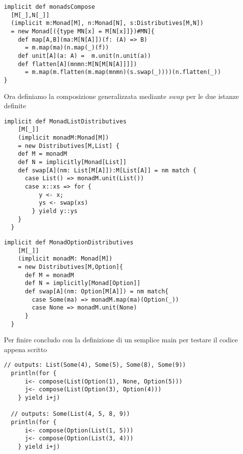 \begin{lstlisting}[style=myScalastyle, caption=SComposable is Monad]
implicit def monadsCompose
  [M[_],N[_]]
  (implicit m:Monad[M], n:Monad[N], s:Distributives[M,N])
  = new Monad[({type MN[x] = M[N[x]]})#MN]{
    def map[A,B](ma:M[N[A]])(f: (A) => B)
      = m.map(ma)(n.map(_)(f))
    def unit[A](a: A) =  m.unit(n.unit(a))
    def flatten[A](mnmn:M[N[M[N[A]]]])
      = m.map(m.flatten(m.map(mnmn)(s.swap(_))))(n.flatten(_))
}
\end{lstlisting}

Ora definiamo la composizione generalizzata mediante $swap$ per le due istanze
definite
\begin{lstlisting}[style=myScalastyle, caption=Composing List]
  implicit def MonadListDistributives
    [M[_]]
    (implicit monadM:Monad[M])
    = new Distributives[M,List] {
    def M = monadM
    def N = implicitly[Monad[List]]
    def swap[A](nm: List[M[A]]):M[List[A]] = nm match {
      case List() => monadM.unit(List())
      case x::xs => for {
          y <- x;
          ys <- swap(xs)
        } yield y::ys
    }
  }
\end{lstlisting}
\pagebreak
\begin{lstlisting}[style=myScalastyle, caption=Composing Optional]
  implicit def MonadOptionDistributives
    [M[_]]
    (implicit monadM: Monad[M])
    = new Distributives[M,Option]{
      def M = monadM
      def N = implicitly[Monad[Option]]
      def swap[A](nm: Option[M[A]]) = nm match{
        case Some(ma) => monadM.map(ma)(Option(_))
        case None => monadM.unit(None)
      }
  }
\end{lstlisting}

Per finire concludo con la definizione di un semplice main per testare il codice
appena scritto
\begin{lstlisting}[style=myScalastyle, caption=Main]
  // outputs: List(Some(4), Some(5), Some(8), Some(9))
  println(for {
      i<- compose(List(Option(1), None, Option(5)))
      j<- compose(List(Option(3), Option(4)))
    } yield i+j)

  // outputs: Some(List(4, 5, 8, 9))
  println(for {
      i<- compose(Option(List(1, 5)))
      j<- compose(Option(List(3, 4)))
    } yield i+j)
\end{lstlisting}
